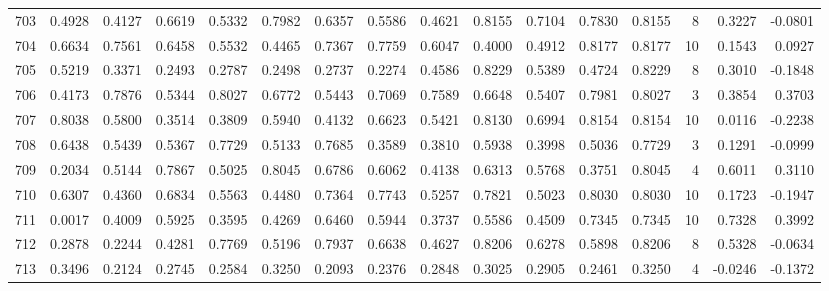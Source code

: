 \begin{tabular}{lrrrrrrrrrrrrrrr}
703 &      0.4928 &  0.4127 &  0.6619 &  0.5332 &  0.7982 &  0.6357 &  0.5586 &  0.4621 &  0.8155 &  0.7104 &   0.7830 &     0.8155 &      8 &                    0.3227 &                    -0.0801 \\
704 &      0.6634 &  0.7561 &  0.6458 &  0.5532 &  0.4465 &  0.7367 &  0.7759 &  0.6047 &  0.4000 &  0.4912 &   0.8177 &     0.8177 &     10 &                    0.1543 &                     0.0927 \\
705 &      0.5219 &  0.3371 &  0.2493 &  0.2787 &  0.2498 &  0.2737 &  0.2274 &  0.4586 &  0.8229 &  0.5389 &   0.4724 &     0.8229 &      8 &                    0.3010 &                    -0.1848 \\
706 &      0.4173 &  0.7876 &  0.5344 &  0.8027 &  0.6772 &  0.5443 &  0.7069 &  0.7589 &  0.6648 &  0.5407 &   0.7981 &     0.8027 &      3 &                    0.3854 &                     0.3703 \\
707 &      0.8038 &  0.5800 &  0.3514 &  0.3809 &  0.5940 &  0.4132 &  0.6623 &  0.5421 &  0.8130 &  0.6994 &   0.8154 &     0.8154 &     10 &                    0.0116 &                    -0.2238 \\
708 &      0.6438 &  0.5439 &  0.5367 &  0.7729 &  0.5133 &  0.7685 &  0.3589 &  0.3810 &  0.5938 &  0.3998 &   0.5036 &     0.7729 &      3 &                    0.1291 &                    -0.0999 \\
709 &      0.2034 &  0.5144 &  0.7867 &  0.5025 &  0.8045 &  0.6786 &  0.6062 &  0.4138 &  0.6313 &  0.5768 &   0.3751 &     0.8045 &      4 &                    0.6011 &                     0.3110 \\
710 &      0.6307 &  0.4360 &  0.6834 &  0.5563 &  0.4480 &  0.7364 &  0.7743 &  0.5257 &  0.7821 &  0.5023 &   0.8030 &     0.8030 &     10 &                    0.1723 &                    -0.1947 \\
711 &      0.0017 &  0.4009 &  0.5925 &  0.3595 &  0.4269 &  0.6460 &  0.5944 &  0.3737 &  0.5586 &  0.4509 &   0.7345 &     0.7345 &     10 &                    0.7328 &                     0.3992 \\
712 &      0.2878 &  0.2244 &  0.4281 &  0.7769 &  0.5196 &  0.7937 &  0.6638 &  0.4627 &  0.8206 &  0.6278 &   0.5898 &     0.8206 &      8 &                    0.5328 &                    -0.0634 \\
713 &      0.3496 &  0.2124 &  0.2745 &  0.2584 &  0.3250 &  0.2093 &  0.2376 &  0.2848 &  0.3025 &  0.2905 &   0.2461 &     0.3250 &      4 &                   -0.0246 &                    -0.1372 \\

\end{tabular}
